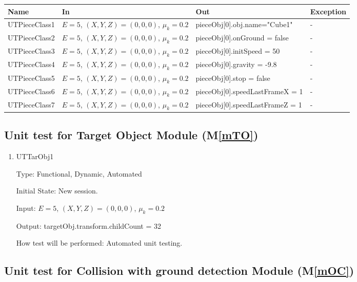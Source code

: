 \documentclass[12pt, titlepage]{article}
\newcommand{\mref}[1]{M\ref{#1}}
\begin{document}
	\begin{center}
		\begin{tabular}{p{2.5cm} p{4cm} p{6cm} p{4cm}}
			\hline
			\textbf{Name} & \textbf{In} & \textbf{Out} & \textbf{Exception} \\
			\hline
			UTPieceClass1 &$E = 5$, $(X,Y,Z) = (0,0,0)$, $\mu_{k} = 0.2$ &pieceObj[0].obj.name="Cube1"&-\\
			UTPieceClass2 &$E = 5$, $(X,Y,Z) = (0,0,0)$, $\mu_{k} = 0.2$ &pieceObj[0].onGround = false&-\\
			UTPieceClass3 &$E = 5$, $(X,Y,Z) = (0,0,0)$, $\mu_{k} = 0.2$ &pieceObj[0].initSpeed = 50&-\\
			UTPieceClass4 &$E = 5$, $(X,Y,Z) = (0,0,0)$, $\mu_{k} = 0.2$ &pieceObj[0].gravity = -9.8&-\\
			UTPieceClass5 &$E = 5$, $(X,Y,Z) = (0,0,0)$, $\mu_{k} = 0.2$ &pieceObj[0].stop = false&-\\
			UTPieceClass6 &$E = 5$, $(X,Y,Z) = (0,0,0)$, $\mu_{k} = 0.2$ &pieceObj[0].speedLastFrameX = 1&-\\
			UTPieceClass7 &$E = 5$, $(X,Y,Z) = (0,0,0)$, $\mu_{k} = 0.2$ &pieceObj[0].speedLastFrameZ = 1&-\\
			\hline		
		\end{tabular}
	\end{center}

	\subsection{Unit test for Target Object Module (\mref{mTO})}
	
	\begin{enumerate}
		
		\item{UTTarObj1\\}
		
		Type: Functional, Dynamic, Automated
		
		Initial State: New session.
		
		Input: $E = 5$, $(X,Y,Z) = (0,0,0)$, $\mu_{k} = 0.2$
		
		Output: targetObj.transform.childCount = 32
		
		How test will be performed: Automated unit testing.
		
	\end{enumerate}
	
	\subsection{Unit test for Collision with ground detection Module (\mref{mOC})}
	
\end{document}
